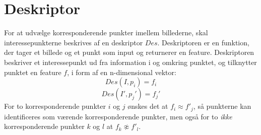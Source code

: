 \section{Deskriptor}
For at udvælge korresponderende punkter imellem billederne, skal interessepunkterne beskrives af en deskriptor $Des$. Deskriptoren er en funktion, der tager et billede og et punkt som input og returnerer en feature. Deskriptoren beskriver et interessepunkt ud fra information i og omkring punktet, og tilknytter punktet en feature $f$, i form af en n-dimensional vektor:
\begin{equation}
Des(I,p_i)=f_i
\end{equation}
\begin{equation}
Des(I',p_j')=f_j'
\end{equation}
For to korresponderende punkter $i$ og $j$ ønskes det at $f_i \approx f'_j$, så punkterne kan identificeres som værende korresponderende punkter, men også for to \textit{ikke} korresponderende punkter $k$ og $l$ at $f_k \not\approx f'_l$.